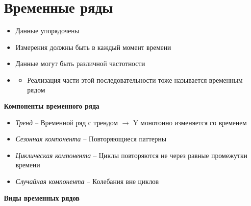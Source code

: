 \documentclass[a4paper, 12pt]{article}
\begin{document}
\section{Временные ряды}

\begin{itemize}
    \item Данные упорядочены
    \item Измерения должны быть в каждый момент времени
    \item Данные могут быть различной частотности
    \item {}
    \begin{itemize}
        \item Реализация части этой последовательности тоже называется временным рядом
    \end{itemize}
\end{itemize}

\textbf{Компоненты временного ряда}

\begin{itemize}
    \item \textit{Тренд} -- Временной ряд с трендом $\rightarrow$ Y монотонно изменяется со временем
    \item \textit{Сезонная компонента} -- Повторяющиеся паттерны
    \item \textit{Циклическая компонента} -- Циклы повторяются не через равные промежутки времени
    \item \textit{Случайная компонента} -- Колебания вне циклов
\end{itemize}

\textbf{Виды временных рядов}
\end{document}
